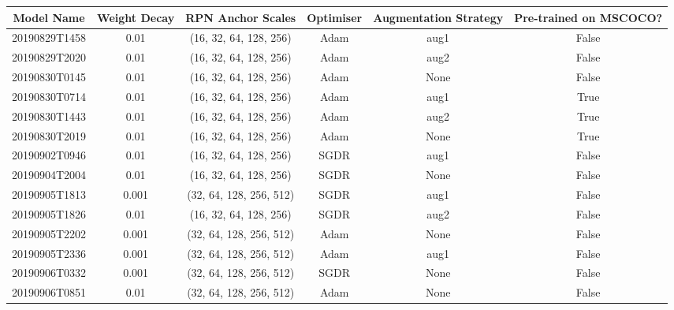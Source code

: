 \begin{table}[!ht]
	\tiny
	\begin{adjustbox}{width=\columnwidth, center}
		\begin{tabular}{cccccc}
			\toprule
			Model Name & Weight Decay &        RPN Anchor Scales & Optimiser & Augmentation Strategy & Pre-trained on MSCOCO? \\
			\midrule
			20190829T1458 &         0.01 &   (16, 32, 64, 128, 256) &      Adam &                  aug1 &                  False \\
			20190829T2020 &         0.01 &   (16, 32, 64, 128, 256) &      Adam &                  aug2 &                  False \\
			20190830T0145 &         0.01 &   (16, 32, 64, 128, 256) &      Adam &                  None &                  False \\
			20190830T0714 &         0.01 &   (16, 32, 64, 128, 256) &      Adam &                  aug1 &                   True \\
			20190830T1443 &         0.01 &   (16, 32, 64, 128, 256) &      Adam &                  aug2 &                   True \\
			20190830T2019 &         0.01 &   (16, 32, 64, 128, 256) &      Adam &                  None &                   True \\
			20190902T0946 &         0.01 &   (16, 32, 64, 128, 256) &      SGDR &                  aug1 &                  False \\
			20190904T2004 &         0.01 &   (16, 32, 64, 128, 256) &      SGDR &                  None &                  False \\
			20190905T1813 &        0.001 &  (32, 64, 128, 256, 512) &      SGDR &                  aug1 &                  False \\
			20190905T1826 &         0.01 &   (16, 32, 64, 128, 256) &      SGDR &                  aug2 &                  False \\
			20190905T2202 &        0.001 &  (32, 64, 128, 256, 512) &      Adam &                  None &                  False \\
			20190905T2336 &        0.001 &  (32, 64, 128, 256, 512) &      Adam &                  aug1 &                  False \\
			20190906T0332 &        0.001 &  (32, 64, 128, 256, 512) &      SGDR &                  None &                  False \\
			20190906T0851 &         0.01 &  (32, 64, 128, 256, 512) &      Adam &                  None &                  False \\

\end{tabular}
\end{adjustbox}
\end{table}
